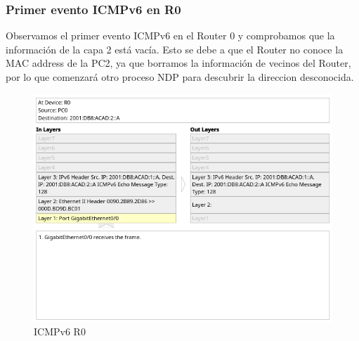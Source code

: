 \documentclass[a4paper,12pt]{article}
\begin{document}
\subsubsection{Primer evento ICMPv6 en R0}
Observamos el primer evento ICMPv6 en el  Router 0 y comprobamos que la información de la capa 2 está vacía. Esto se debe a que el Router no conoce la MAC address de la PC2, ya que borramos la información de vecinos del Router, por lo que comenzará otro proceso NDP para descubrir la direccion desconocida. \\
\begin{figure}[h]
    \centering
    \includegraphics[width=1\textwidth]{imagenes/4.png}
    \caption{ICMPv6 R0}
\end{figure}\\

\FloatBarrier
\end{document}
